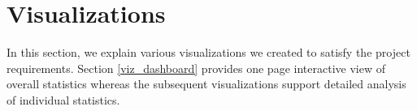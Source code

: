 \section{Visualizations} \label{viz}
In this section, we explain various visualizations we created to satisfy the
project requirements. Section \ref{viz_dashboard} provides one page
interactive view of overall statistics whereas the subsequent visualizations
support detailed analysis of individual statistics.

